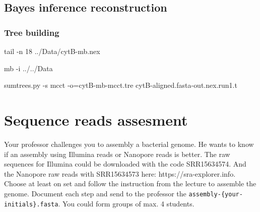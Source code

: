 \documentclass[
  letterpaper,
  DIV=11,
  numbers=noendperiod]{scrreprt}
\newenvironment{Shaded}{\begin{snugshade}}{\end{snugshade}}
\newcommand{\AttributeTok}[1]{\textcolor[rgb]{0.40,0.46,0.14}{#1}}
\newcommand{\ExtensionTok}[1]{\textcolor[rgb]{0.00,0.46,0.62}{#1}}
\newcommand{\FunctionTok}[1]{\textcolor[rgb]{0.28,0.35,0.67}{#1}}
\newcommand{\NormalTok}[1]{\textcolor[rgb]{0.00,0.46,0.62}{#1}}
\newcommand{\OperatorTok}[1]{\textcolor[rgb]{0.37,0.37,0.37}{#1}}
\begin{document}
\hypertarget{bayes-inference-reconstruction}{%
\section*{Bayes inference
reconstruction}\label{bayes-inference-reconstruction}}

\hypertarget{tree-building-1}{%
\subsection*{Tree building}\label{tree-building-1}}

\begin{Shaded}
\begin{Highlighting}[]
\FunctionTok{tail} \AttributeTok{{-}n}\NormalTok{ 18 ../Data/cytB{-}mb.nex}
\end{Highlighting}
\end{Shaded}

\begin{Shaded}
\begin{Highlighting}[]
\ExtensionTok{mb} \AttributeTok{{-}i}\NormalTok{ ../../Data}
\end{Highlighting}
\end{Shaded}

\begin{Shaded}
\begin{Highlighting}[]
\ExtensionTok{sumtrees.py} \AttributeTok{{-}s}\NormalTok{ mcct }\AttributeTok{{-}o}\OperatorTok{=}\NormalTok{cytB{-}mb{-}mcct.tre cytB{-}aligned.fasta{-}out.nex.run1.t}
\end{Highlighting}
\end{Shaded}

\hypertarget{sequence-reads-assesment}{%
\chapter{Sequence reads assesment}\label{sequence-reads-assesment}}

\begin{tcolorbox}[standard jigsaw,rightrule=.15mm, bottomtitle=1mm, toprule=.15mm, titlerule=0mm, toptitle=1mm, opacitybacktitle=0.6, arc=.35mm, colframe=quarto-callout-warning-color-frame, colbacktitle=quarto-callout-warning-color!10!white, coltitle=black, title=\textcolor{quarto-callout-warning-color}{\faExclamationTriangle}\hspace{0.5em}{Challenge}, bottomrule=.15mm, colback=white, leftrule=.75mm, left=2mm, opacityback=0]
Your professor challenges you to assembly a bacterial genome. He wants
to know if an assembly using Illumina reads or Nanopore reads is better.
The raw sequences for Illumina could be downloaded with the code
SRR15634574. And the Nanopore raw reads with SRR15634573 here:
https://sra-explorer.info. Choose at least on set and follow the
instruction from the lecture to assemble the genome. Document each step
and send to the professor the \texttt{assembly-\{your-initials\}.fasta}.
You could form groups of max. 4 students.
\end{tcolorbox}
\end{document}
